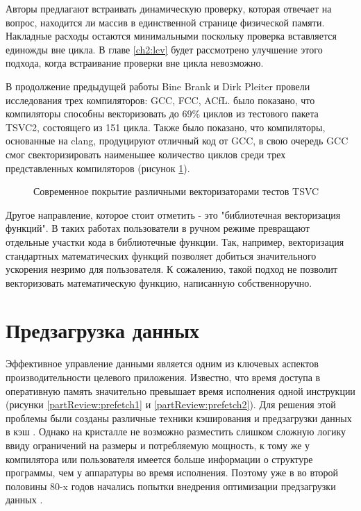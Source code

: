 Авторы предлагают встраивать динамическую проверку, которая  отвечает на вопрос, находится ли массив в единственной странице физической памяти. Накладные расходы остаются минимальными поскольку проверка вставляется единожды вне цикла. В главе \ref{ch2:lcv} будет рассмотрено улучшение этого подхода, когда встраивание проверки вне цикла невозможно.
 
В продолжение предыдущей работы Bine Brank и Dirk Pleiter \cite{brank2022assessing} провели исследования трех компиляторов: GCC, FCC, ACfL. было показано, что компиляторы способны векторизовать до 69\% циклов из тестового пакета TSVC2, состоящего из 151 цикла. Также было показано, что компиляторы, основанные на clang, продуцируют отличный код от GCC, в свою очередь GCC смог свекторизировать наименьшее количество циклов среди трех представленных компиляторов (рисунок \ref{partReview:vectorization}).
 \begin{figure}[htbp]
 	\centering
 	
 	\caption{Современное покрытие различными векторизаторами тестов TSVC \cite{brank2022assessing}}
 	\label{partReview:vectorization}
 \end{figure}
 
Другое направление, которое стоит отметить - это "библиотечная векторизация функций". В таких работах пользователи в ручном режиме превращают отдельные участки кода в библиотечные функции. Так, например, векторизация стандартных  математических функций \cite{petrogalli2018llvm} позволяет добиться значительного ускорения незримо для пользователя. К сожалению, такой подход не позволит векторизовать математическую функцию, написанную собственноручно.
 
 
\section{Предзагрузка данных} \label{pr:prefetch}
Эффективное управление данными является одним из ключевых аспектов производительности целевого приложения. Известно, что время доступа в оперативную память значительно превышает время исполнения одной инструкции (рисунки \ref{partReview:prefetch1} и \ref{partReview:prefetch2}). Для решения этой проблемы были созданы различные техники кэширования и предзагрузки данных в кэш \cite{smith1987design, tse1998cpu}.  Однако на кристалле не возможно разместить слишком сложную логику ввиду ограничений на размеры и потребляемую мощность, к тому же у компилятора или пользователя имеется больше информации о структуре программы, чем у аппаратуры во время исполнения. Поэтому уже в во второй половины 80-x годов начались попытки внедрения оптимизации предзагрузки данных \cite{lee1987effectiveness}. 

